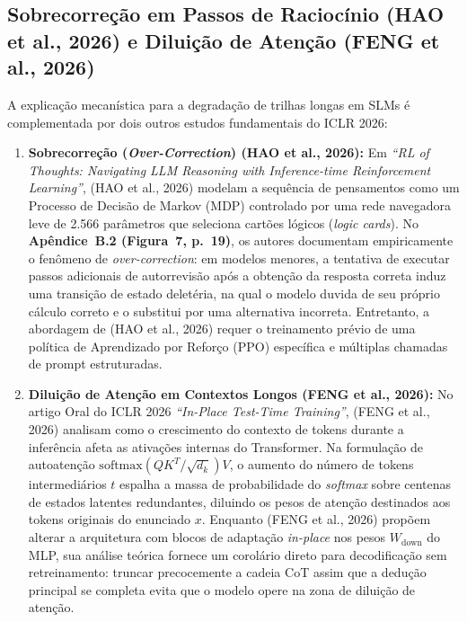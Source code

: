 \documentclass[9pt,conference]{IEEEtran}
\begin{document}
\subsection{Sobrecorre\c{c}\~{a}o em Passos de Racioc\'{i}nio (HAO et al., 2026) e Dilui\c{c}\~{a}o de Aten\c{c}\~{a}o (FENG et al., 2026)}

A explica\c{c}\~{a}o mecan\'{i}stica para a degrada\c{c}\~{a}o de trilhas longas em SLMs \'{e} complementada por dois outros estudos fundamentais do ICLR 2026:
\begin{enumerate}
    \item \textbf{Sobrecorre\c{c}\~{a}o (\textit{Over-Correction}) (HAO et al., 2026):} Em \textit{``RL of Thoughts: Navigating LLM Reasoning with Inference-time Reinforcement Learning''}, (HAO et al., 2026) modelam a sequ\^{e}ncia de pensamentos como um Processo de Decis\~{a}o de Markov (MDP) controlado por uma rede navegadora leve de 2.566 par\^{a}metros que seleciona cart\~{o}es l\'{o}gicos (\textit{logic cards}). No \textbf{Ap\^{e}ndice~B.2 (Figura~7, p.~19)}, os autores documentam empiricamente o fen\^{o}meno de \textit{over-correction}: em modelos menores, a tentativa de executar passos adicionais de autorrevis\~{a}o ap\'{o}s a obten\c{c}\~{a}o da resposta correta induz uma transi\c{c}\~{a}o de estado delet\'{e}ria, na qual o modelo duvida de seu pr\'{o}prio c\'{a}lculo correto e o substitui por uma alternativa incorreta. Entretanto, a abordagem de (HAO et al., 2026) requer o treinamento pr\'{e}vio de uma pol\'{i}tica de Aprendizado por Refor\c{c}o (PPO) espec\'{i}fica e m\'{u}ltiplas chamadas de prompt estruturadas.
    \item \textbf{Dilui\c{c}\~{a}o de Aten\c{c}\~{a}o em Contextos Longos (FENG et al., 2026):} No artigo Oral do ICLR 2026 \textit{``In-Place Test-Time Training''}, (FENG et al., 2026) analisam como o crescimento do contexto de tokens durante a infer\^{e}ncia afeta as ativa\c{c}\~{o}es internas do Transformer. Na formula\c{c}\~{a}o de autoaten\c{c}\~{a}o $\text{softmax}(QK^T/\sqrt{d_k})V$, o aumento do n\'{u}mero de tokens intermedi\'{a}rios $t$ espalha a massa de probabilidade do \textit{softmax} sobre centenas de estados latentes redundantes, diluindo os pesos de aten\c{c}\~{a}o destinados aos tokens originais do enunciado $x$. Enquanto (FENG et al., 2026) prop\~{o}em alterar a arquitetura com blocos de adapta\c{c}\~{a}o \textit{in-place} nos pesos $W_{\text{down}}$ do MLP, sua an\'{a}lise te\'{o}rica fornece um corol\'{a}rio direto para decodifica\c{c}\~{a}o sem retreinamento: truncar precocemente a cadeia CoT assim que a dedu\c{c}\~{a}o principal se completa evita que o modelo opere na zona de dilui\c{c}\~{a}o de aten\c{c}\~{a}o.
\end{enumerate}
\end{document}
